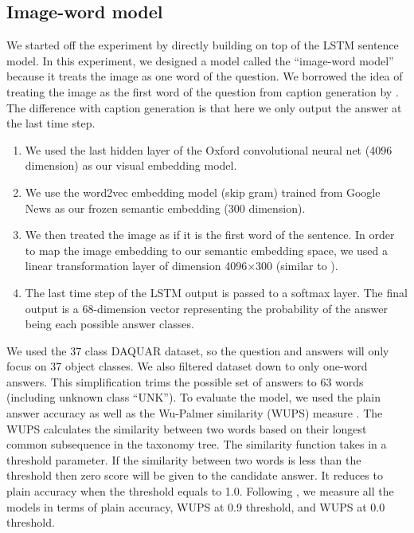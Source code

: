 \subsection{Image-word model}
We started off the experiment by directly building on top of the LSTM sentence model. In this experiment, we designed a model called the ``image-word model'' because it treats the image as one word of the question. We borrowed the idea of treating the image as the first word of the question from caption generation by \cite{vinyals14}. The difference with caption generation is that here we only output the answer at the last time step.

\begin{enumerate}
	\item We used the last hidden layer of the Oxford convolutional neural net (4096 dimension) \cite{simonyan14} as our visual embedding model.
	\item We use the word2vec embedding model (skip gram) trained from Google News \cite{mikolov13} as our frozen semantic embedding (300 dimension). 
	\item We then treated the image as if it is the first word of the sentence. In order to map the image embedding to our semantic embedding space, we used a linear transformation layer of dimension 4096$\times$300 (similar to \cite{frome13}).
	\item The last time step of the LSTM output is passed to a softmax layer. The final output is a 68-dimension vector representing the probability of the answer being each possible answer classes.
\end{enumerate}

We used the 37 class DAQUAR dataset, so the question and answers will only focus on 37 object classes. We also filtered dataset down to only one-word answers. This simplification trims the possible set of answers to 63 words (including unknown class ``UNK'').
To evaluate the model, we used the plain answer accuracy as well as the Wu-Palmer similarity (WUPS) measure \cite{wu94, malinowski14b}. The WUPS calculates the similarity between two words based on their longest common subsequence in the taxonomy tree. The similarity function takes in a threshold parameter. If the similarity between two words is less than the threshold then zero score will be given to the candidate answer. It reduces to plain accuracy when the threshold equals to 1.0. Following \cite{malinowski14b}, we measure all the models in terms of plain accuracy, WUPS at 0.9 threshold, and WUPS at 0.0 threshold.

